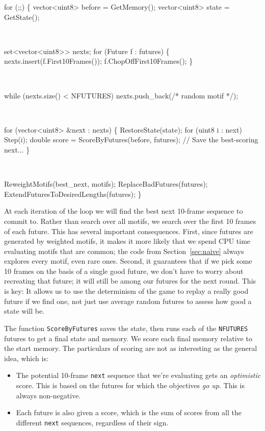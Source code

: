 \documentclass[twocolumn]{article}
\begin{document}
\begin{code}
for (;;) \{
  vector<uint8> before = GetMemory();
  vector<uint8> state = GetState();

 \ 

  set<vector<uint8>> nexts;
  for (Future f : futures) \{
    nexts.insert(f.First10Frames());
    f.ChopOffFirst10Frames();
  \}

 \ 

  while (nexts.size() < NFUTURES)
    nexts.push\_back(/* random motif */);

 \ 

  for (vector<uint8> &next : nexts) \{
    RestoreState(state);
    for (uint8 i : next) Step(i);
    double score =
      ScoreByFutures(before, futures);
    // Save the best-scoring next...
  \}

 \ 

  ReweightMotifs(best\_next, motifs);
  ReplaceBadFutures(futures);
  ExtendFuturesToDesiredLengths(futures);
\}
\end{code}

At each iteration of the loop we will find the best next 10-frame
sequence to commit to. Rather than search over all motifs, we search
over the first 10 frames of each future. This has several important
consequences. First, since futures are generated by weighted motifs,
it makes it more likely that we spend CPU time evaluating motifs that
are common; the code from Section~\ref{sec:naive} always explores
every motif, even rare ones. Second, it guarantees that if we pick
some 10 frames on the basis of a single good future, we don't have to
worry about recreating that future; it will still be among our futures
for the next round. This is key: It allows us to use the determinism
of the game to replay a really good future if we find one, not just
use average random futures to assess how good a state will be.

The function {\tt ScoreByFutures} saves the state, then runs each
of the {\tt NFUTURES} futures to get a final state and memory. We
score each final memory relative to the start memory. The particulars
of scoring are not as interesting as the general idea, which is:
\begin{itemize}
\item The potential 10-frame {\tt next} sequence that we're
evaluating gets an {\em optimistic} score. This is based on the futures
for which the objectives {\em go up}. This is always non-negative.
\item Each future is also given a score, which is the sum of scores
from all the different {\tt next} sequences, regardless of their sign.
\end{itemize}
\end{document}
